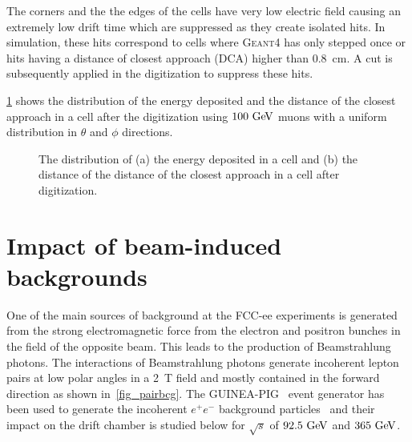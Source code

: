 \documentclass{article}
\begin{document}
The corners and the the edges of the cells have very low electric field causing an extremely low drift time which are suppressed as they create isolated hits. In simulation, these hits correspond to cells where \textsc{Geant4} has only stepped once or hits having a distance of closest approach (DCA) higher than 0.8~cm. A cut is subsequently applied in the digitization to suppress these hits.

\cref{fig_DCA_Edep} shows the distribution of the energy deposited and the distance of the closest approach in a cell after the digitization using $100\,\mathrm{\,Ge\kern -0.1em V}$ muons with a uniform distribution in $\theta$ and $\phi$ directions.

\begin{figure}[!h]
\hfil
{}
\caption{The distribution of (a) the energy deposited in a cell and (b) the distance of the distance of the closest approach in a cell after digitization.}
\label{fig_DCA_Edep}
\end{figure}

\section{Impact of beam-induced backgrounds}
One of the main sources of background at the FCC-ee experiments is generated from the strong electromagnetic force from the electron and positron bunches in the field of the opposite beam. This leads to the production of Beamstrahlung photons. The interactions of Beamstrahlung photons generate incoherent lepton pairs at low polar angles in a 2~T field and mostly contained in the forward direction as shown in~\cref{fig_pairbcg}. The \textsc{GUINEA-PIG}~\cite{Schulte:382453} event generator has been used to generate the incoherent $e^+e^-$ background particles~\cite{Voutsinas:2017eca} and their impact on the drift chamber is studied below for $\sqrt{s}$ of $92.5\,\mathrm{\,Ge\kern -0.1em V}$ and $365\,\mathrm{\,Ge\kern -0.1em V}$.
\end{document}
